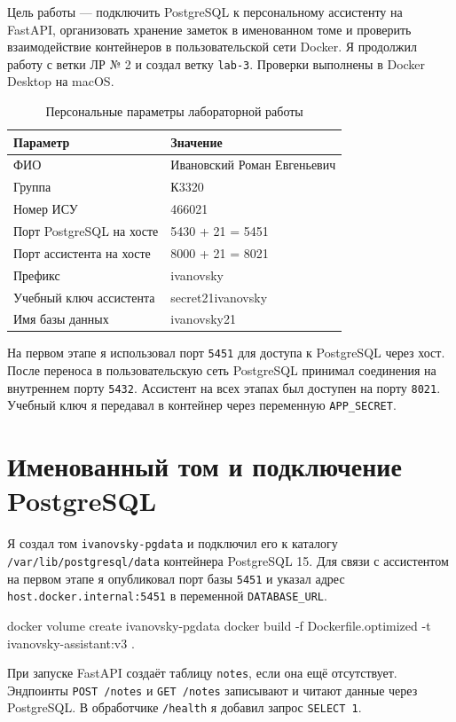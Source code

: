 Цель работы --- подключить PostgreSQL к персональному ассистенту на FastAPI, организовать хранение заметок в именованном томе и проверить взаимодействие контейнеров в пользовательской сети Docker. Я продолжил работу с ветки ЛР № 2 и создал ветку \texttt{lab-3}. Проверки выполнены в Docker Desktop на macOS.

\begin{table}[H]
\caption{Персональные параметры лабораторной работы}
\begin{tabularx}{\textwidth}{|p{61mm}|X|}
\hline
Параметр & Значение \\\hline
ФИО & Ивановский Роман Евгеньевич \\\hline
Группа & К3320 \\\hline
Номер ИСУ & 466021 \\\hline
Порт PostgreSQL на хосте & 5430 + 21 = 5451 \\\hline
Порт ассистента на хосте & 8000 + 21 = 8021 \\\hline
Префикс & ivanovsky \\\hline
Учебный ключ ассистента & secret21ivanovsky \\\hline
Имя базы данных & ivanovsky21 \\\hline
\end{tabularx}
\end{table}

На первом этапе я использовал порт \texttt{5451} для доступа к PostgreSQL через хост. После переноса в пользовательскую сеть PostgreSQL принимал соединения на внутреннем порту \texttt{5432}. Ассистент на всех этапах был доступен на порту \texttt{8021}. Учебный ключ я передавал в контейнер через переменную \texttt{APP\_SECRET}.

\chapter{Именованный том и подключение PostgreSQL}
Я создал том \texttt{ivanovsky-pgdata} и подключил его к каталогу \texttt{/var/lib/postgresql/data} контейнера PostgreSQL 15. Для связи с ассистентом на первом этапе я опубликовал порт базы \texttt{5451} и указал адрес \texttt{host.docker.internal:5451} в переменной \texttt{DATABASE\_URL}.

\begin{code}
docker volume create ivanovsky-pgdata
docker build -f Dockerfile.optimized -t ivanovsky-assistant:v3 .
\end{code}

При запуске FastAPI создаёт таблицу \texttt{notes}, если она ещё отсутствует. Эндпоинты \texttt{POST /notes} и \texttt{GET /notes} записывают и читают данные через PostgreSQL. В обработчике \texttt{/health} я добавил запрос \texttt{SELECT 1}.

